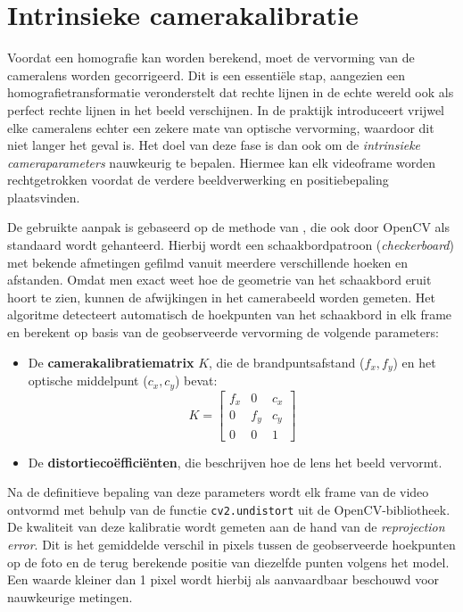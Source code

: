 
\section{Intrinsieke camerakalibratie}
\label{sec:kalibratie}

Voordat een homografie kan worden berekend, moet de vervorming van de cameralens worden gecorrigeerd. Dit is een essentiële stap, aangezien een homografietransformatie veronderstelt dat rechte lijnen in de echte wereld ook als perfect rechte lijnen in het beeld verschijnen. In de praktijk introduceert vrijwel elke cameralens echter een zekere mate van optische vervorming, waardoor dit niet langer het geval is. Het doel van deze fase is dan ook om de \textit{intrinsieke cameraparameters} nauwkeurig te bepalen. Hiermee kan elk videoframe worden rechtgetrokken voordat de verdere beeldverwerking en positiebepaling plaatsvinden.

De gebruikte aanpak is gebaseerd op de methode van \textcite{Zhang2000}, die ook door OpenCV als standaard wordt gehanteerd. Hierbij wordt een schaakbordpatroon (\textit{checkerboard}) met bekende afmetingen gefilmd vanuit meerdere verschillende hoeken en afstanden. Omdat men exact weet hoe de geometrie van het schaakbord eruit hoort te zien, kunnen de afwijkingen in het camerabeeld worden gemeten. Het algoritme detecteert automatisch de hoekpunten van het schaakbord in elk frame en berekent op basis van de geobserveerde vervorming de volgende parameters:

\begin{itemize}
    \item De \textbf{camerakalibratiematrix} $K$, die de brandpuntsafstand ($f_x, f_y$) en het optische middelpunt ($c_x, c_y$) bevat:
          \[
              K = \begin{bmatrix}
                  f_x & 0   & c_x \\
                  0   & f_y & c_y \\
                  0   & 0   & 1
              \end{bmatrix}
          \]
    \item De \textbf{distortieco{\"e}ffici{\"e}nten}, die beschrijven hoe de lens het beeld vervormt.
\end{itemize}

Na de definitieve bepaling van deze parameters wordt elk frame van de video ontvormd met behulp van de functie \texttt{cv2.undistort} uit de OpenCV-bibliotheek. De kwaliteit van deze kalibratie wordt gemeten aan de hand van de \textit{reprojection error}. Dit is het gemiddelde verschil in pixels tussen de geobserveerde hoekpunten op de foto en de terug berekende positie van diezelfde punten volgens het model. Een waarde kleiner dan 1 pixel wordt hierbij als aanvaardbaar beschouwd voor nauwkeurige metingen.